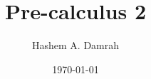\documentclass[a4paper]{article}
\title{Pre-calculus 2}
\author{Hashem A. Damrah}
\date{\today}
\begin{document}
  \maketitle
  \mbox{}\newpage
  \mbox{}\newpage
  
  \newpage
  
\end{document}
